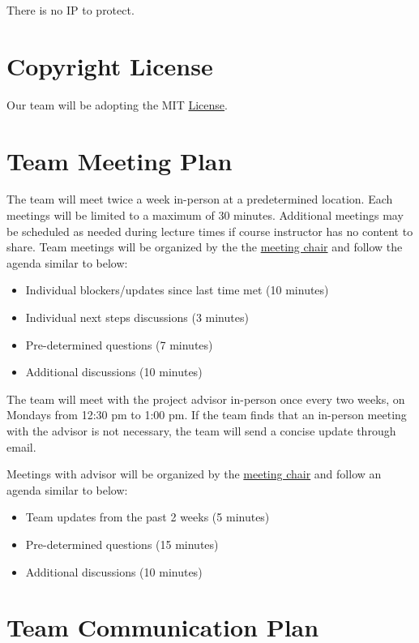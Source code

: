 \documentclass{article}
\begin{document}
There is no IP to protect.

\section{Copyright License}

Our team will be adopting the MIT
\href{https://github.com/Nirmal-code/SixSense/blob/main/LICENSE}{License}.

\section{Team Meeting Plan}

The team will meet twice a week in-person at a predetermined location. Each
meetings will be limited to a maximum of 30 minutes. Additional meetings may be
scheduled as needed during lecture times if course instructor has no content to
share. Team meetings will be organized by the the
\hyperref[role:meeting_chair]{meeting chair} and follow the agenda similar to
below:

\begin{itemize}
  \item Individual blockers/updates since last time met (10 minutes)
  \item Individual next steps discussions (3 minutes)
  \item Pre-determined questions (7 minutes)
  \item Additional discussions (10 minutes)
\end{itemize}

The team will meet with the project advisor in-person once every two weeks, on
Mondays from 12:30 pm to 1:00 pm. If the team finds that an in-person meeting
with the advisor is not necessary, the team will send a concise update through
email.

Meetings with advisor will be organized by the
\hyperref[role:meeting_chair]{meeting chair} and follow an agenda similar to
below:

\begin{itemize}
  \item Team updates from the past 2 weeks (5 minutes)
  \item Pre-determined questions (15 minutes)
  \item Additional discussions (10 minutes)
\end{itemize}

\section{Team Communication Plan} \label{sec:TeamCommunicationPlan}
\end{document}
